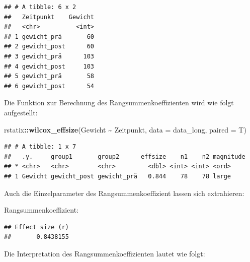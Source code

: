 \documentclass[
]{book}
\newenvironment{Shaded}{\begin{snugshade}}{\end{snugshade}}
\newcommand{\AttributeTok}[1]{\textcolor[rgb]{0.13,0.29,0.53}{#1}}
\newcommand{\FunctionTok}[1]{\textcolor[rgb]{0.13,0.29,0.53}{\textbf{#1}}}
\newcommand{\NormalTok}[1]{#1}
\newcommand{\SpecialCharTok}[1]{\textcolor[rgb]{0.81,0.36,0.00}{\textbf{#1}}}
\begin{document}
\begin{verbatim}
## # A tibble: 6 x 2
##   Zeitpunkt    Gewicht
##   <chr>          <int>
## 1 gewicht_prä       60
## 2 gewicht_post      60
## 3 gewicht_prä      103
## 4 gewicht_post     103
## 5 gewicht_prä       58
## 6 gewicht_post      54
\end{verbatim}

Die Funktion zur Berechnung des Rangsummenkoeffizienten wird wie folgt aufgestellt:

\begin{Shaded}
\begin{Highlighting}[]
\NormalTok{rstatix}\SpecialCharTok{::}\FunctionTok{wilcox\_effsize}\NormalTok{(Gewicht }\SpecialCharTok{\textasciitilde{}}\NormalTok{ Zeitpunkt, }\AttributeTok{data =}\NormalTok{ data\_long, }\AttributeTok{paired =}\NormalTok{ T)}
\end{Highlighting}
\end{Shaded}

\begin{verbatim}
## # A tibble: 1 x 7
##   .y.     group1       group2      effsize    n1    n2 magnitude
## * <chr>   <chr>        <chr>         <dbl> <int> <int> <ord>    
## 1 Gewicht gewicht_post gewicht_prä   0.844    78    78 large
\end{verbatim}

Auch die Einzelparameter des Rangsummenkoeffizient lassen sich extrahieren:

Rangsummenkoeffizient:

\begin{Shaded}
\end{Shaded}

\begin{verbatim}
## Effect size (r) 
##       0.8438155
\end{verbatim}

Die Interpretation des Rangsummenkoeffizienten lautet wie folgt:
\end{document}
